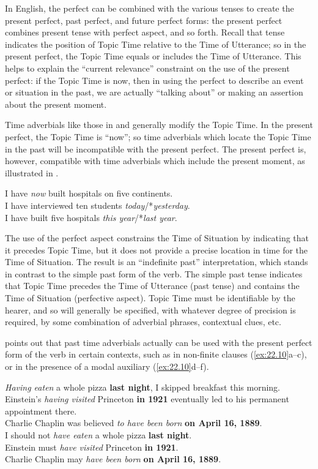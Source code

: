 In English, the perfect can be combined with the various tenses to create the present perfect, past perfect, and future perfect forms: the present perfect combines present tense with perfect aspect, and so forth. Recall that tense indicates the position of Topic Time relative to the Time of Utterance; so in the present perfect, the Topic Time equals or includes the Time of Utterance. This helps to explain the “current relevance” constraint on the use of the present perfect: if the Topic Time is now, then in using the perfect to describe an event or situation in the past, we are actually “talking about” or making an assertion about the present moment.



Time adverbials like those in  and  generally modify the Topic Time. In the present perfect, the Topic Time is “now”; so time adverbials which locate the Topic Time in the past will be incompatible with the present perfect. The present perfect is, however, compatible with time adverbials which include the present moment, as illustrated in .


\ea \label{ex:22.9}
\ea I have \textit{now} built hospitals on five continents.\\
\ex I have interviewed ten students \textit{today}/*\textit{yesterday}.\\
\ex I have built five hospitals \textit{this year}/*\textit{last year}.
                       \z
\z
\newpage 

The use of the perfect aspect constrains the Time of Situation by indicating that it precedes Topic Time, but it does not provide a precise location in time for the Time of Situation. The result is an “indefinite past” interpretation, which stands in contrast to the simple past form of the verb. The simple past tense indicates that Topic Time precedes the Time of Utterance (past tense) and contains the Time of Situation (perfective aspect). Topic Time must be identifiable by the hearer, and so will generally be specified, with whatever degree of precision is required, by some combination of adverbial phrases, contextual clues, etc.



\citet[55]{Comrie1976} points out that past time adverbials actually can be used with the present perfect form of the verb in certain contexts, such as in non-finite clauses (\ref{ex:22.10}a--c), or in the presence of a modal auxiliary (\ref{ex:22.10}d--f).


\ea \label{ex:22.10}
\ea \textit{Having eaten} a whole pizza \textbf{last night}, I skipped breakfast this morning.\\
\ex Einstein’s \textit{having visited} Princeton \textbf{in 1921} eventually led to his permanent appointment there.\\
\ex Charlie Chaplin was believed \textit{to have been born} \textbf{on April 16, 1889}.\\
\ex I should not \textit{have eaten} a whole pizza \textbf{last night}.\\
\ex Einstein must \textit{have visited} Princeton \textbf{in 1921}.\\
\ex Charlie Chaplin may \textit{have been born} \textbf{on April 16, 1889}.
                       \z
\z


